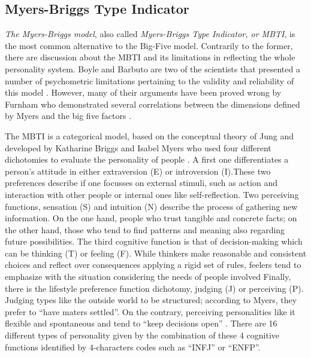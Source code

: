 \subsection{Myers-Briggs Type Indicator}
\textit{The Myers-Briggs model}, also called \textit{Myers-Briggs Type Indicator, or MBTI}, is the most common alternative to the Big-Five model.
Contrarily to the former, there are discussion about the MBTI and its limitations in reflecting the whole personality system. 
Boyle and Barbuto are two of the scientists that presented a number of psychometric limitations pertaining to the validity and reliability of this model \cite{boyle1995myers,barbuto1997critique}.
However, many of their arguments have been proved wrong by Furnham who demonstrated several correlations between the dimensions defined by Myers and the big five factors \cite{furnham1996big}.

The MBTI is a categorical model, based on the conceptual theory of Jung and developed by Katharine Briggs and Isabel Myers who used four different dichotomies to evaluate the personality of people \cite{jung1971personality}. 
A first one differentiates a person's attitude in either extraversion (E) or introversion (I).These two preferences describe if one focusses on external stimuli, such as action and interaction with other people or internal ones like self-reflection.
Two perceiving functions, sensation (S) and intuition (N) describe the process of gathering new information. On the one hand, people who trust tangible and concrete facts; on the other hand, those who tend to find patterns and meaning also regarding future possibilities.
The third cognitive function is that of decision-making which can be thinking (T) or feeling (F). While thinkers make reasonable and consistent choices and reflect over consequences applying a rigid set of rules, feelers tend to emphasize with the situation considering the needs of people involved
Finally, there is the lifestyle preference function dichotomy, judging (J) or perceiving (P). Judging types like the outside world to be structured; according to Myers, they prefer to ``have maters settled''. On the contrary, perceiving personalities like it flexible and spontaneous and tend to ``keep decisions open'' \cite{myers2010gifts}.
There are 16 different types of personality given by the combination of these 4 cognitive functions identified by 4-characters codes such as ``INFJ'' or ``ENFP''.

